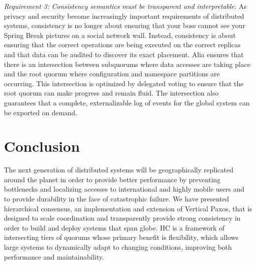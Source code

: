 \documentclass[10pt,conference]{IEEEtran}
\newcommand{\hc}{hierarchical consensus\xspace}
\begin{document}
\emph{Requirement 3: Consistency semantics must be transparent and interpretable.}
As privacy and security become increasingly important requirements of distributed
systems, consistency is no longer about ensuring that your boss cannot see your
Spring Break pictures on a social network wall.
Instead, consistency is about ensuring that the correct operations are being
executed on the correct replicas and that data can be audited to discover its
exact placement.
Alia ensures that there is an intersection between subquorums where data accesses
are taking place and the root quorum where configuration and namespace partitions
are occurring.
This intersection is optimized by delegated voting to ensure that the root
quorum can make progress and remain fluid.
The intersection also guarantees that a complete, externalizable log of events
for the global system can be exported on demand.





\section{Conclusion}
\label{section:conclusion}

The next generation of distributed systems will be geographically replicated around the
planet in order to provide better performance by preventing bottlenecks and localizing
accesses to international and highly mobile users and to provide durability in the face
of catastrophic failure.
We have presented \hc, an implementation and extension of Vertical Paxos, that is
designed to scale coordination and transparently provide strong consistency in order to
build and deploy systems that span globe.
HC is a framework of intersecting tiers of quorums whose primary benefit is flexibility,
which allows large systems to dynamically adapt to changing conditions, improving both
performance and maintainability.
\end{document}
